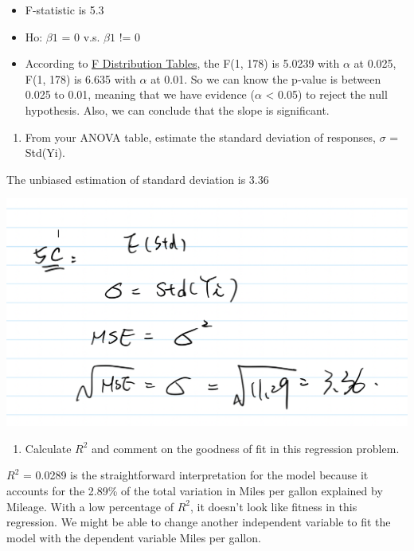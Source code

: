 \documentclass[
]{article}
\providecommand{\tightlist}{%
  \setlength{\itemsep}{0pt}\setlength{\parskip}{0pt}}
\begin{document}
\begin{itemize}
\tightlist
\item
  F-statistic is 5.3
\item
  Ho: \(\beta1\) = 0 v.s. \(\beta1\) != 0
\item
  According to \href{http://socr.ucla.edu/Applets.dir/F_Table.html}{F
  Distribution Tables}, the F(1, 178) is 5.0239 with \(\alpha\) at
  0.025, F(1, 178) is 6.635 with \(\alpha\) at 0.01. So we can know the
  p-value is between 0.025 to 0.01, meaning that we have evidence
  (\(\alpha\) \textless{} 0.05) to reject the null hypothesis. Also, we
  can conclude that the slope is significant.
\end{itemize}

\begin{enumerate}
\def\labelenumi{(\alph{enumi})}
\setcounter{enumi}{2}
\tightlist
\item
  From your ANOVA table, estimate the standard deviation of responses,
  \(\sigma\) = Std(Yi).\\
\end{enumerate}

The unbiased estimation of standard deviation is 3.36

\includegraphics{pics/Screen Shot 2021-02-21 at 8.21.54 PM.png}

\begin{enumerate}
\def\labelenumi{(\alph{enumi})}
\setcounter{enumi}{3}
\tightlist
\item
  Calculate \(R^2\) and comment on the goodness of fit in this
  regression problem.
\end{enumerate}

\(R^2\) = 0.0289 is the straightforward interpretation for the model
because it accounts for the 2.89\% of the total variation in Miles per
gallon explained by Mileage. With a low percentage of \(R^2\), it
doesn't look like fitness in this regression. We might be able to change
another independent variable to fit the model with the dependent
variable Miles per gallon.
\end{document}
